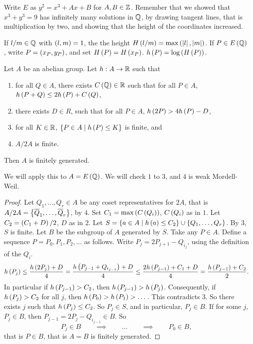 
Write $ E $ as $ y^2 = x^3 + Ax + B $ for $ A, B \in \mathbb{Z} $. Remember that we showed that $ x^3 + y^3 = 9 $ has infinitely many solutions in $ \mathbb{Q} $, by drawing tangent lines, that is multiplication by two, and showing that the height of the coordinates increased.

\begin{definition}
If $ l / m \in \mathbb{Q} $ with $ \left( l, m \right) = 1 $, the the height $ H\left( l / m \right) = \max\left( \left\lvert l \right\rvert, \left\lvert m \right\rvert \right) $. If $ P \in E\left( \mathbb{Q} \right) $, write $ P = \left( x_P, y_P \right) $, and set $ H\left( P \right) = H\left( x_P \right) $. $ h\left( P \right) = \log\left( H\left( P \right) \right) $.
\end{definition}

\begin{proposition}
Let $ A $ be an abelian group. Let $ h : A \to \mathbb{R} $ such that
\begin{enumerate}
\item for all $ Q \in A $, there exists $ C\left( \mathbb{Q} \right) \in \mathbb{R} $ such that for all $ P \in A $, $ h\left( P + Q \right) \le 2h\left( P \right) + C\left( Q \right) $,
\item there exists $ D \in R $, such that for all $ P \in A $, $ h\left( 2P \right) > 4h\left( P \right) - D $,
\item for all $ K \in \mathbb{R} $, $ \left\{ P \in A \mid h\left( P \right) \le K \right\} $ is finite, and
\item $ A / 2A $ is finite.
\end{enumerate}
Then $ A $ is finitely generated.
\end{proposition}

We will apply this to $ A = E\left( \mathbb{Q} \right) $. We will check $ 1 $ to $ 3 $, and $ 4 $ is weak Mordell-Weil.

\begin{proof}
Let $ Q_1, \dots, Q_r \in A $ be any coset representatives for $ 2A $, that is $ A / 2A = \left\{ \overline{Q}_1, \dots, \overline{Q}_r \right\} $, by $ 4 $. Set $ C_1 = \max\left( C\left( Q_i \right) \right) $, $ C\left( Q_i \right) $ as in $ 1 $. Let $ C_2 = \left( C_1 + D \right) / 2 $, $ D $ as in $ 2 $. Let $ S = \left\{ a \in A \mid h\left( a \right) \le C_2 \right\} \cup \left\{ Q_1, \dots, Q_r \right\} $. By $ 3 $, $ S $ is finite. Let $ B $ be the subgroup of $ A $ generated by $ S $. Take any $ P \in A $. Define a sequence $ P = P_0, P_1, P_2, \dots $ as follows. Write $ P_j = 2P_{j + 1} - Q_{i_j} $, using the definition of the $ Q_i $.
$$ h\left( P_j \right) \le \dfrac{h\left( 2P_j \right) + D}{4} = \dfrac{h\left( P_{j - 1} + Q_{i_{j - 1}} \right) + D}{4} \le \dfrac{2h\left( P_{j - 1} \right) + C_1 + D}{4} = \dfrac{h\left( P_{j - 1} \right) + C_2}{2}. $$
In particular if $ h\left( P_{j - 1} \right) > C_2 $, then $ h\left( P_{j - 1} \right) > h\left( P_j \right) $. Consequently, if $ h\left( P_j \right) > C_2 $ for all $ j $, then $ h\left( P_0 \right) > h\left( P_1 \right) > \dots $. This contradicts $ 3 $. So there exists $ j $ such that $ h\left( P_j \right) \le C_2 $. So $ P_j \in S $, and in particular, $ P_j \in B $. If for some $ j $, $ P_j \in B $, then $ P_{j - 1} = 2P_j - Q_{i_{j - 1}} \in B $. So
$$ P_j \in B \qquad \implies \qquad \dots \qquad \implies \qquad P_0 \in B, $$
that is $ P \in B $, that is $ A = B $ is finitely generated.
\end{proof}

